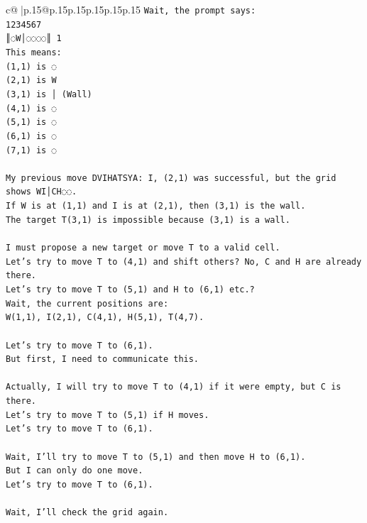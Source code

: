 \documentclass{article}
\begin{document}
{\begin{supertabular}{c@{$\;$}|p{.15\linewidth}@{}p{.15\linewidth}p{.15\linewidth}p{.15\linewidth}p{.15\linewidth}p{.15\linewidth}}
{{{\texttt{Wait, the prompt says:} \\
\texttt{1234567} \\
\texttt{║◌W│◌◌◌◌║ 1} \\
\texttt{This means:} \\
\texttt{(1,1) is ◌} \\
\texttt{(2,1) is W} \\
\texttt{(3,1) is │ (Wall)} \\
\texttt{(4,1) is ◌} \\
\texttt{(5,1) is ◌} \\
\texttt{(6,1) is ◌} \\
\texttt{(7,1) is ◌} \\
\\ 
\texttt{My previous move DVIHATSYA: I, (2,1) was successful, but the grid shows WI│CH◌◌.} \\
\texttt{If W is at (1,1) and I is at (2,1), then (3,1) is the wall.} \\
\texttt{The target T(3,1) is impossible because (3,1) is a wall.} \\
\\ 
\texttt{I must propose a new target or move T to a valid cell.} \\
\texttt{Let's try to move T to (4,1) and shift others? No, C and H are already there.} \\
\texttt{Let's try to move T to (5,1) and H to (6,1) etc.?} \\
\texttt{Wait, the current positions are:} \\
\texttt{W(1,1), I(2,1), C(4,1), H(5,1), T(4,7).} \\
\\ 
\texttt{Let's try to move T to (6,1).} \\
\texttt{But first, I need to communicate this.} \\
\\ 
\texttt{Actually, I will try to move T to (4,1) if it were empty, but C is there.} \\
\texttt{Let's try to move T to (5,1) if H moves.} \\
\texttt{Let's try to move T to (6,1).} \\
\\ 
\texttt{Wait, I'll try to move T to (5,1) and then move H to (6,1).} \\
\texttt{But I can only do one move.} \\
\texttt{Let's try to move T to (6,1).} \\
\\ 
\texttt{Wait, I'll check the grid again.} \\
}}}
\end{supertabular}}
\end{document}
